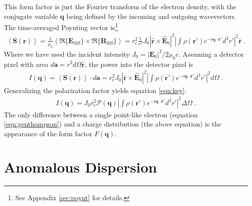\documentclass[12pt]{article}
\renewcommand{\vec}[1]{\boldsymbol{#1}}
\newcommand{\hvec}[1]{\hat{\vec{#1}}}
\newcommand{\avg}[1]{\left\langle #1 \right\rangle}
\newcommand{\abs}[1]{\left| #1 \right|}
\begin{document}
This form factor is just the Fourier transform of the electron density, with the conjugate variable $\vec{q}$ being defined by the incoming and outgoing wavevectors.  The time-averaged Poynting vector is\footnote{See Appendix \ref{sec:poynt} for details.}
\begin{align}
\avg{\vec{S}(\vec{r})} = \frac{1}{\mu_0}\avg{
\Re\{\vec{E}_{\text{diff}}\}\times\Re\{\vec{B}_{\text{diff}}\}} = r_e^2 
\frac{1}{r^2} J_0 | \hvec{r} \times  \hvec{E}_0 |^2 \left| \int \rho(\vec{r}') 
e^{-i\vec{q}\cdot\vec{r}'} d^3r' \right|^2 \hvec{r} \;.
\end{align}
Where we have used the incident intensity $J_0 = |\vec{E}_0|^2/2\mu_0c$.  
Assuming a detector pixel with area $d\vec{a} = r^2 d\Omega \hvec{r}$, the power 
into the detector pixel is
\begin{align}
I(\vec{q}) = \avg{\vec{S}(\vec{r})} \cdot d\vec{a} = r_e^2 J_0 | \hvec{r} \times 
 \hvec{E}_0 |^2 \left| \int \rho(\vec{r}') e^{-i\vec{q}\cdot\vec{r}'} d^3r' 
\right|^2 d\Omega\;.
\end{align}
Generalizing the polarization factor yields equation \ref{eqn:key}:
\begin{align}\label{eqn:keyF}
    I(\vec{q}) = J_0 r_e^2  \mathcal{P}(\vec{q})  
\abs{\int \rho(\vec{r}') e^{-i\vec{q}\cdot\vec{r}'} d^3r'}^2 \Delta \Omega \;.
\end{align}
The only difference between a single point-like electron (equation  
\ref{eqn:genthompson}) and a charge distribution (the above equation) is the 
appearance of the form factor $F(\vec{q})$.   


\section{Anomalous Dispersion}
\end{document}

